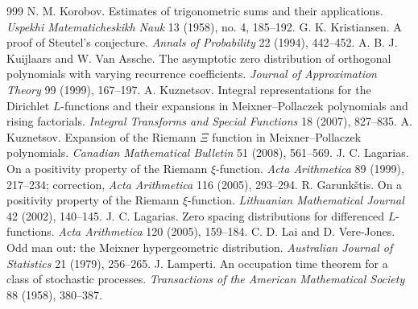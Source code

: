 \begin{thebibliography}{999}
 N. M. Korobov. Estimates of trigonometric sums and their applications. \emph{Uspekhi Matematicheskikh Nauk} 13 (1958), no. 4, 185--192.
 G. K. Kristiansen. A proof of Steutel's conjecture. \emph{Annals of Probability} 22 (1994), 442--452.
 A. B. J. Kuijlaars and W. Van Assche. The asymptotic zero distribution of orthogonal polynomials with varying recurrence coefficients. \emph{Journal of Approximation Theory} 99 (1999), 167--197.
 A. Kuznetsov. Integral representations for the Dirichlet $L$-functions and their expansions in Meixner--Pollaczek polynomials and rising factorials. \emph{Integral Transforms and Special Functions} 18 (2007), 827--835.
 A. Kuznetsov. Expansion of the Riemann $\Xi$ function in Meixner--Pollaczek polynomials. \emph{Canadian Mathematical Bulletin} 51 (2008), 561--569.
 J. C. Lagarias. On a positivity property of the Riemann $\xi$-function. \emph{Acta Arithmetica} 89 (1999), 217--234; correction, \emph{Acta Arithmetica} 116 (2005), 293--294. %
 R. Garunk\v{s}tis. On a positivity property of the Riemann $\xi$-function. \emph{Lithuanian Mathematical Journal} 42 (2002), 140--145. %
 J. C. Lagarias. Zero spacing distributions for differenced $L$-functions. \emph{Acta Arithmetica} 120 (2005), 159--184.
 C. D. Lai and D. Vere-Jones. Odd man out: the Meixner hypergeometric distribution. \emph{Australian Journal of Statistics} 21 (1979), 256--265.
 J. Lamperti. An occupation time theorem for a class of stochastic processes. \emph{Transactions of the American Mathematical Society} 88 (1958), 380--387.

\end{thebibliography}
